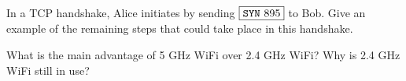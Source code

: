 \begin{exercise}
    In a TCP handshake, Alice initiates by sending $\boxed{\texttt{SYN}\ 895}$ to Bob. Give an example of the remaining steps that could take place in this handshake.
\end{exercise}

\begin{exercise}
    What is the main advantage of 5 GHz WiFi over 2.4 GHz WiFi? Why is 2.4 GHz WiFi still in use?
\end{exercise}